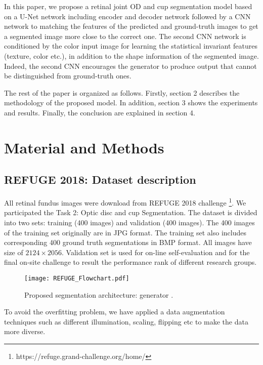 \documentclass[runningheads,a4paper]{llncs}
\begin{document}
In this paper, we propose a retinal joint OD and cup segmentation model based on a U-Net network including encoder and decoder network followed by a CNN network to matching the features of the predicted and ground-truth images to get a segmented image more close to the correct one. The second CNN network is conditioned by the color input image for learning the statistical invariant features (texture, color etc.), in addition to the shape information of the segmented image. Indeed, the second CNN encourages the generator to produce output that cannot be distinguished from ground-truth ones.

The rest of the paper is organized as follows. Firstly, section 2 describes the methodology of the proposed model. In addition, section 3 shows the experiments and results. Finally, the conclusion are explained in section 4.


\section{Material and Methods}

\subsection{REFUGE 2018: Dataset description}
All retinal fundus images were download from REFUGE 2018 challenge \footnote{https://refuge.grand-challenge.org/home/}. We participated the Task 2: Optic disc and cup Segmentation. The dataset is divided into two sets: training (400 images) and validation (400 images). The 400 images of the training set  originally are in JPG format. The training set also includes corresponding 400 ground truth segmentations in BMP format. All images have size of $2124\times 2056$. Validation set is used for on-line self-evaluation and for the final on-site challenge to result the performance rank of different research groups.


\label{subsec:massSegcGAN}
\begin{figure*}[htp]
\centering
\texttt{[image: REFUGE\_Flowchart.pdf]}
\caption{Proposed segmentation architecture: generator .}
\label{fig:cGAN architecture}
\end{figure*}



To avoid the overfitting problem, we have applied a data augmentation techniques such as different illumination, scaling, flipping etc to make the data more diverse. 
\end{document}
